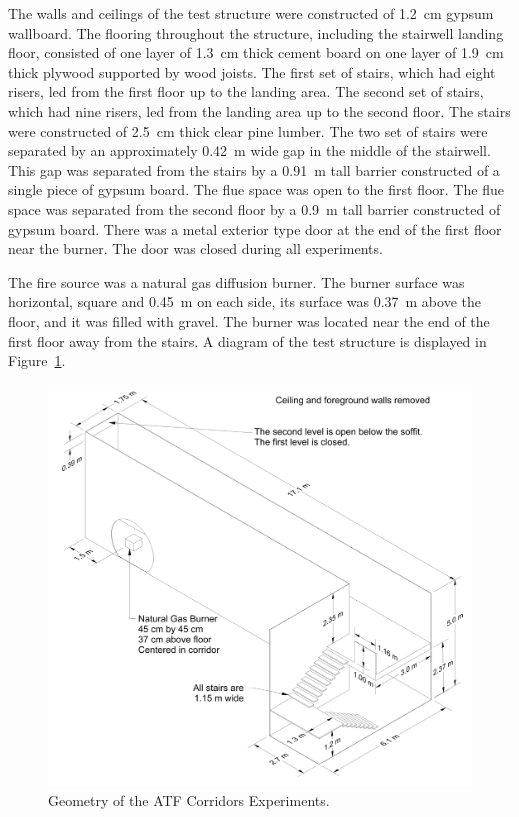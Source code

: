 The walls and ceilings of the test structure were constructed of 1.2~cm gypsum wallboard. The flooring throughout the structure, including the stairwell landing floor, consisted of one layer of 1.3~cm thick cement board on one layer of 1.9~cm thick plywood supported by wood joists. The first set of stairs, which had eight risers, led from the first floor up to the landing area. The second set of stairs, which had nine risers, led from the landing area up to the second floor. The stairs were constructed of 2.5~cm thick clear pine lumber. The two set of stairs were separated by an approximately 0.42~m wide gap in the middle of the stairwell. This gap was separated from the stairs by a 0.91~m tall barrier constructed of a single piece of gypsum board. The flue space was open to the first floor.  The flue space was separated from the second floor by a 0.9~m tall barrier constructed of gypsum board. There was a metal exterior type door at the end of the first floor near the burner.  The door was closed during all experiments.

The fire source was a natural gas diffusion burner.  The burner surface was horizontal, square and 0.45~m on each side, its surface was 0.37~m above the floor, and it was filled with gravel. The burner was located near the end of the first floor away from the stairs. A diagram of the test structure is displayed in Figure~\ref{ATF Drawing}.

\begin{figure}[p]
\includegraphics[width=\textwidth]{FIGURES/ATF_Corridors/ATF_Corridors_Drawing}
\caption{Geometry of the ATF Corridors Experiments.}
\label{ATF Drawing}
\end{figure}

